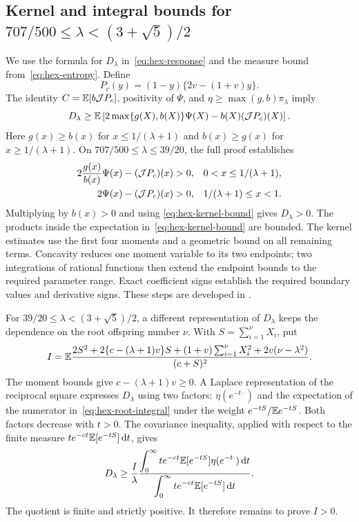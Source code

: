 \subsection{Kernel and integral bounds for \texorpdfstring{$707/500\le\lambda<(3+\sqrt5)/2$}{707/500 <= lambda < (3+sqrt(5))/2}}
We use the formula for $D_\lambda$ in~\eqref{eq:hex-response} and the measure bound from~\eqref{eq:hex-entropy}. Define
\[
 P_c(y)=(1-y)\{2v-(1+v)y\}.
\]
The identity $C=\mathbb E[b\mathcal J P_c]$, positivity of $\Psi$, and
$\eta\ge\max(g,b)\pi_\lambda$ imply
\begin{equation}\label{eq:hex-kernel-bound}
 D_\lambda\ge
 \mathbb E\left[2\max\{g(X),b(X)\}\Psi(X)-b(X)(\mathcal J P_c)(X)\right].
\end{equation}
Here $g(x)\ge b(x)$ for $x\le1/(\lambda+1)$ and $b(x)\ge g(x)$ for $x\ge1/(\lambda+1)$. On
$707/500\le\lambda\le39/20$, the full proof establishes
\begin{align*}
 2\frac{g(x)}{b(x)}\Psi(x)-(\mathcal J P_c)(x)&>0,
       &&0<x\le1/(\lambda+1),\\
 2\Psi(x)-(\mathcal J P_c)(x)&>0,
       &&1/(\lambda+1)\le x<1.
\end{align*}
Multiplying by $b(x)>0$ and using \eqref{eq:hex-kernel-bound} gives
$D_\lambda>0$. The products inside the expectation in~\eqref{eq:hex-kernel-bound} are bounded. The kernel estimates use the first four moments and a geometric bound on all remaining terms. Concavity reduces one moment variable to its two endpoints; two integrations of rational functions then extend the endpoint bounds to the required parameter range. Exact coefficient signs establish the required boundary
values and derivative signs. These steps are developed in
\cite[Section~6.6, Lemmas~6.31--6.35]{FullVersion}.

For $39/20\le\lambda<(3+\sqrt5)/2$, a different representation of $D_\lambda$ keeps the dependence on the root offspring number $\nu$. With $S=\sum_{i=1}^{\nu}X_i$, put
\begin{equation}\label{eq:hex-root-integral}
 I=\mathbb E\frac{2S^2+2\{c-(\lambda+1)v\}S
       +(1+v)\sum_{i=1}^{\nu}X_i^2+2v(\nu-\lambda^2)}{(c+S)^2}.
\end{equation}
The moment bounds give $c-(\lambda+1)v\ge0$. A Laplace representation of the reciprocal square expresses $D_\lambda$ using two factors: $\eta(e^{-t\cdot})$ and the expectation of the numerator in~\eqref{eq:hex-root-integral} under the weight $e^{-tS}/\mathbb E e^{-tS}$. Both factors decrease with $t>0$. The covariance inequality, applied with respect to the finite measure $t e^{-ct}\mathbb E[e^{-tS}]\,\mathrm d t$, gives
\[
 D_\lambda\ge\frac I\lambda
 \frac{\displaystyle\int_0^\infty t e^{-ct}\mathbb E[e^{-tS}]\eta(e^{-t\cdot})\,\mathrm d t}
 {\displaystyle\int_0^\infty t e^{-ct}\mathbb E[e^{-tS}]\,\mathrm d t}.
\]
The quotient is finite and strictly positive. It therefore remains to prove $I>0$.

